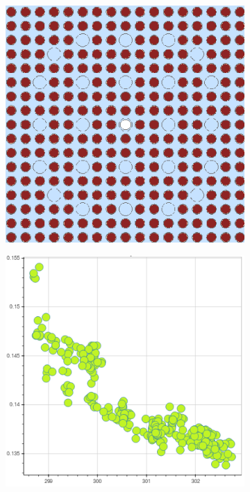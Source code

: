 \begin{figure}[h!]
\centering
\begin{subfigure}{0.45\textwidth}
  \centering
  \includegraphics[width=0.9\linewidth]{figures/unsupervised/features/assm-16/geometry}
  \caption{}
  \label{fig:chap10-fiss-mean-std-geom}
\end{subfigure}%
\begin{subfigure}{0.45\textwidth}
  \centering
  \includegraphics[width=0.9\linewidth]{figures/unsupervised/features/assm-16/u235-fiss/mean-std/mgxs}

\end{subfigure}
\end{figure}
